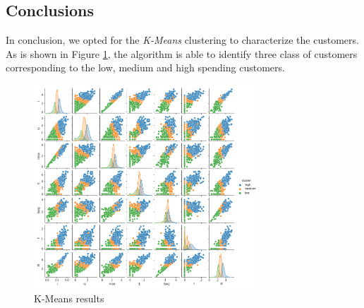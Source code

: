 \newpage

\subsection{Conclusions}

In conclusion, we opted for the \emph{K-Means} clustering to characterize the customers. As is shown in Figure \ref{fig:pairplot}, the algorithm is able to identify three class of customers corresponding to the low, medium and high spending customers.

\begin{figure}[h!]
	\vspace{5mm}
	\captionsetup{justification=centering}
	\centering
	\includegraphics[width=0.75\textwidth]{img/clustering/pair_plot_clust.png}
	\centering
	\caption{K-Means results}
	\label{fig:pairplot}
\end{figure}
